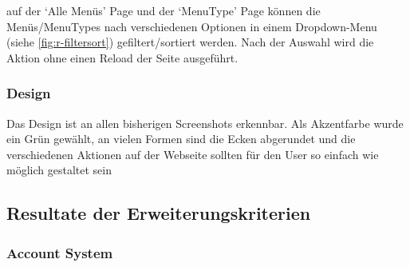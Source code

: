 auf der `Alle Menüs' Page und der `MenuType' Page können die Menüs/MenuTypes
nach verschiedenen Optionen in einem Dropdown-Menu (siehe
\ref{fig:r-filtersort}) gefiltert/sortiert werden. Nach der Auswahl wird die
Aktion ohne einen Reload der Seite ausgeführt.

\subsubsection*{Design}
Das Design ist an allen bisherigen Screenshots erkennbar. Als Akzentfarbe wurde
ein Grün gewählt, an vielen Formen sind die Ecken abgerundet und die
verschiedenen Aktionen auf der Webseite sollten für den User so einfach wie
möglich gestaltet sein

\subsection{Resultate der Erweiterungskriterien}

\subsubsection*{Account System}

